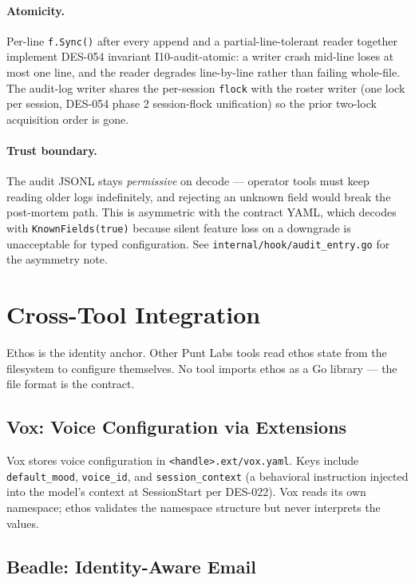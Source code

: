 \documentclass[a4paper,10pt]{article}
\newcommand{\field}[1]{\texttt{#1}}
\newcommand{\fpath}[1]{\texttt{#1}}
\begin{document}
\paragraph{Atomicity.}  Per-line \texttt{f.Sync()} after every
append and a partial-line-tolerant reader together implement
DES-054 invariant I10-audit-atomic: a writer crash mid-line
loses at most one line, and the reader degrades line-by-line
rather than failing whole-file.  The audit-log writer shares
the per-session \texttt{flock} with the roster writer (one lock
per session, DES-054 phase 2 session-flock unification) so the
prior two-lock acquisition order is gone.

\paragraph{Trust boundary.}  The audit JSONL stays
\emph{permissive} on decode --- operator tools must keep reading
older logs indefinitely, and rejecting an unknown field would
break the post-mortem path.  This is asymmetric with the
contract YAML, which decodes with \texttt{KnownFields(true)}
because silent feature loss on a downgrade is unacceptable for
typed configuration.  See \fpath{internal/hook/audit\_entry.go}
for the asymmetry note.

\section{Cross-Tool Integration}

Ethos is the identity anchor.  Other Punt Labs tools read ethos
state from the filesystem to configure themselves.  No tool imports
ethos as a Go library --- the file format is the contract.

\subsection{Vox: Voice Configuration via Extensions}

Vox stores voice configuration in
\fpath{<handle>.ext/vox.yaml}.  Keys include \field{default\_mood},
\field{voice\_id}, and \field{session\_context} (a behavioral
instruction injected into the model's context at SessionStart per
DES-022).  Vox reads its own namespace; ethos validates the
namespace structure but never interprets the values.

\subsection{Beadle: Identity-Aware Email}
\end{document}
